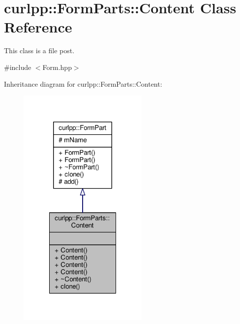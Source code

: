 \hypertarget{classcurlpp_1_1FormParts_1_1Content}{\section{curlpp\-:\-:Form\-Parts\-:\-:Content Class Reference}
\label{classcurlpp_1_1FormParts_1_1Content}
}


This class is a file post.  




{\ttfamily \#include $<$Form.\-hpp$>$}



Inheritance diagram for curlpp\-:\-:Form\-Parts\-:\-:Content\-:
\nopagebreak
\begin{figure}[H]
\begin{center}
\leavevmode
\includegraphics[width=180pt]{classcurlpp_1_1FormParts_1_1Content__inherit__graph}
\end{center}
\end{figure}


